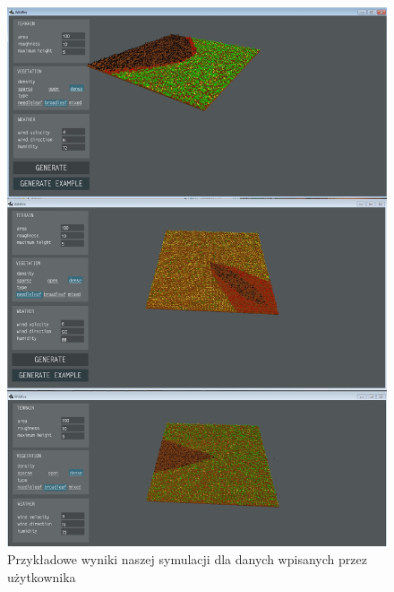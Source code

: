 \documentclass[a4paper, 11pt]{article}
\begin{document}
	\begin{figure}[H]
		\centerline{\includegraphics[scale=0.4]{test1}}
		\raggedright{	\caption{Przykładowe wyniki naszej symulacji dla danych wpisanych przez użytkownika}}
	\end{figure}\begin{figure}[H]

\end{figure}
\end{document}
